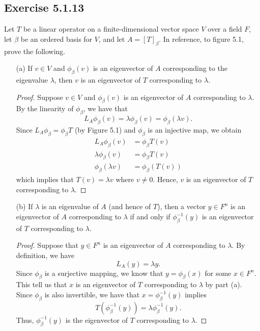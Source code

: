\subsection*{Exercise 5.1.13} Let \( T  \) be a linear operator on a finite-dimensional vector space \( V  \) over a field \( F \), let \( \beta  \) be an ordered basis for \( V  \), and let \( A = [T]_{\beta} \). In reference, to figure 5.1, prove the following.
\begin{enumerate}
    \item[(a)] If \( v \in V  \) and \( {\phi}_{\beta}(v)  \) is an eigenvector of \( A  \) corresponding to the eigenvalue \( \lambda  \), then \( v  \) is an eigenvector of \( T  \) corresponding to \( \lambda  \).
        \begin{proof}
        Suppose \( v \in V  \) and \( {\phi}_{\beta}(v)  \) is an eigenvector of \( A  \) corresponding to \( \lambda  \). By the linearity of \( {\phi}_{\beta} \), we have that
        \[  {L}_{A}{\phi}_{\beta}(v) = \lambda {\phi}_{\beta}(v) = {\phi}_{\beta}(\lambda v ).  \]
        Since \( {L}_{A} {\phi}_{\beta} = {\phi}_{\beta}T  \) (by Figure 5.1) and \( {\phi}_{\beta} \) is an injective map, we obtain  
        \begin{align*}
            {L}_{A} {\phi}_{\beta} (v) &= {\phi}_{\beta}T(v) \\
            \lambda {\phi}_{\beta}(v) &= {\phi}_{\beta} T(v) \\
            {\phi}_{\beta}(\lambda v ) &= {\phi}_{\beta}(T(v))
        \end{align*}
        which implies that \( T(v) = \lambda v  \) where \( v \neq 0  \). Hence, \( v  \) is an eigenvector of \( T  \) corresponding to \( \lambda  \).
        \end{proof}
    \item[(b)] If \( \lambda  \) is an eigenvalue of \( A  \) (and hence of \( T \)), then a vector \( y \in F^{n} \) is an eigenvector of \( A  \) corresponding to \( \lambda  \) if and only if \( {\phi}_{\beta}^{-1}(y)  \) is an eigenvector of \( T  \) corresponding to \( \lambda  \).
        \begin{proof}
        Suppose that \( y \in F^{n} \) is an eigenvector of \( A  \) corresponding to \( \lambda  \). By definition, we have 
        \[ {L}_{A}(y) = \lambda y. \tag{1}\]
        Since \( {\phi}_{\beta} \) is a surjective mapping, we know that \( y = {\phi}_{\beta}(x)  \) for some \( x \in F^{n} \). This tell us that \( x  \) is an eigenvector of \( T  \) corresponding to \( \lambda  \) by part (a). Since \( {\phi}_{\beta} \) is also invertible, we have that \( x = {\phi}_{\beta}^{-1}(y) \) implies 
        \[  T( {\phi}_{\beta}^{-1}(y)) = \lambda {\phi}_{\beta}^{-1}(y). \]
        Thus, \( {\phi}_{\beta}^{-1}(y)  \) is the eigenvector of \( T  \) corresponding to \( \lambda  \). 
        \end{proof}
\end{enumerate}

